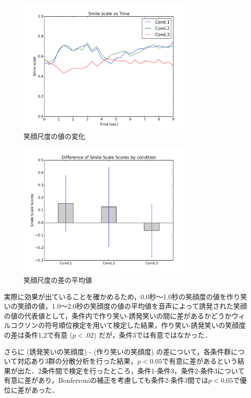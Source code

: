 \documentclass[submit,techreq]{ec2014}
\begin{document}
\begin{figure}[h!]
  \centering  
\includegraphics[width=90mm, bb=0 0 600 450]{images/smooth5_avg.png}
\caption{笑顔尺度の値の変化}
  \label{graph-smooth}
\end{figure}

\begin{figure}[h!]
  \centering  
\includegraphics[width=90mm, bb=0 0 600 450]{images/graph-diff.png}
\caption{笑顔尺度の差の平均値}
  \label{graph-avg}
\end{figure}

実際に効果が出ていることを確かめるため，0.0秒〜1.0秒の笑顔度の値を作り笑いの笑顔の値，1.0〜2.0秒の笑顔度の値の平均値を音声によって誘発された笑顔の値の代表値として，条件内で作り笑い-誘発笑いの間に差があるかどうかウィルコクソンの符号順位検定を用いて検定した結果，作り笑い-誘発笑いの笑顔度の差は条件1,2で有意 ($p<.02$) だが，条件3では有意ではなかった．

さらに (誘発笑いの笑顔度) - (作り笑いの笑顔度) の差について，各条件群について対応あり3群の分散分析を行った結果，$p<0.05$で有意に差があるという結果が出た．2条件間で検定を行ったところ，条件1-条件3，条件2-条件3について有意に差があり，Bonferroniの補正を考慮しても条件2-条件3間では$p<0.05$で優位に差があった．
\end{document}
